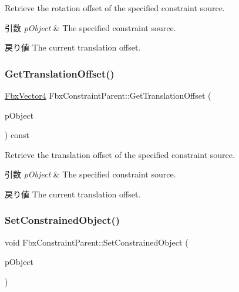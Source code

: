 Retrieve the rotation offset of the specified constraint source. 
\begin{DoxyParams}{引数}
{\em p\+Object} & The specified constraint source. \\
\hline
\end{DoxyParams}
\begin{DoxyReturn}{戻り値}
The current translation offset. 
\end{DoxyReturn}
\mbox{\label{class_fbx_constraint_parent_a8ba24a43fc99dbef7819ccb921b1ba19}} 
\subsubsection{\texorpdfstring{Get\+Translation\+Offset()}{GetTranslationOffset()}}
{\footnotesize\ttfamily \hyperlink{class_fbx_vector4}{Fbx\+Vector4} Fbx\+Constraint\+Parent\+::\+Get\+Translation\+Offset (\begin{DoxyParamCaption}\item[{const \hyperlink{class_fbx_object}{Fbx\+Object} $\ast$}]{p\+Object }\end{DoxyParamCaption}) const}

Retrieve the translation offset of the specified constraint source. 
\begin{DoxyParams}{引数}
{\em p\+Object} & The specified constraint source. \\
\hline
\end{DoxyParams}
\begin{DoxyReturn}{戻り値}
The current translation offset. 
\end{DoxyReturn}
\mbox{\label{class_fbx_constraint_parent_a49473a23e0aae69dd06ee4bd19b6fee3}} 
\subsubsection{\texorpdfstring{Set\+Constrained\+Object()}{SetConstrainedObject()}}
{\footnotesize\ttfamily void Fbx\+Constraint\+Parent\+::\+Set\+Constrained\+Object (\begin{DoxyParamCaption}\item[{\hyperlink{class_fbx_object}{Fbx\+Object} $\ast$}]{p\+Object }\end{DoxyParamCaption})}

